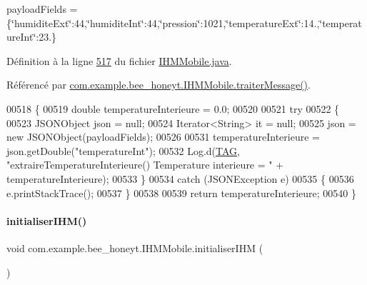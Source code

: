 payload\+Fields = \{\char`\"{}humidite\+Ext\char`\"{}\+:44,\char`\"{}humidite\+Int\char`\"{}\+:44,\char`\"{}pression\char`\"{}\+:1021,\char`\"{}temperature\+Ext\char`\"{}\+:14.,\char`\"{}temperature\+Int\char`\"{}\+:23.\}

Définition à la ligne \hyperlink{_i_h_m_mobile_8java_source_l00517}{517} du fichier \hyperlink{_i_h_m_mobile_8java_source}{I\+H\+M\+Mobile.\+java}.



Référencé par \hyperlink{_i_h_m_mobile_8java_source_l00374}{com.\+example.\+bee\+\_\+honeyt.\+I\+H\+M\+Mobile.\+traiter\+Message()}.


\begin{DoxyCode}
00518     \{
00519         \textcolor{keywordtype}{double} temperatureInterieure = 0.0;
00520 
00521         \textcolor{keywordflow}{try}
00522         \{
00523             JSONObject json = null;
00524             Iterator<String> it = null;
00525             json = \textcolor{keyword}{new} JSONObject(payloadFields);
00526 
00531             temperatureInterieure = json.getDouble(\textcolor{stringliteral}{"temperatureInt"});
00532             Log.d(\hyperlink{classcom_1_1example_1_1bee__honeyt_1_1_i_h_m_mobile_a366987bf9bb2ed1010b2f967d4efa263}{TAG}, \textcolor{stringliteral}{"extraireTemperatureInterieure() Temperature interieure = "} + 
      temperatureInterieure);
00533         \}
00534         \textcolor{keywordflow}{catch} (JSONException e)
00535         \{
00536             e.printStackTrace();
00537         \}
00538 
00539         \textcolor{keywordflow}{return} temperatureInterieure;
00540     \}
\end{DoxyCode}
\mbox{\label{classcom_1_1example_1_1bee__honeyt_1_1_i_h_m_mobile_a4aa9d23a3aebf2d1a3cd62a15a4e0f2d}} 
\paragraph{\texorpdfstring{initialiser\+I\+H\+M()}{initialiserIHM()}}
{\footnotesize\ttfamily void com.\+example.\+bee\+\_\+honeyt.\+I\+H\+M\+Mobile.\+initialiser\+I\+HM (\begin{DoxyParamCaption}{ }\end{DoxyParamCaption})\hspace{0.3cm}{\ttfamily [private]}}



